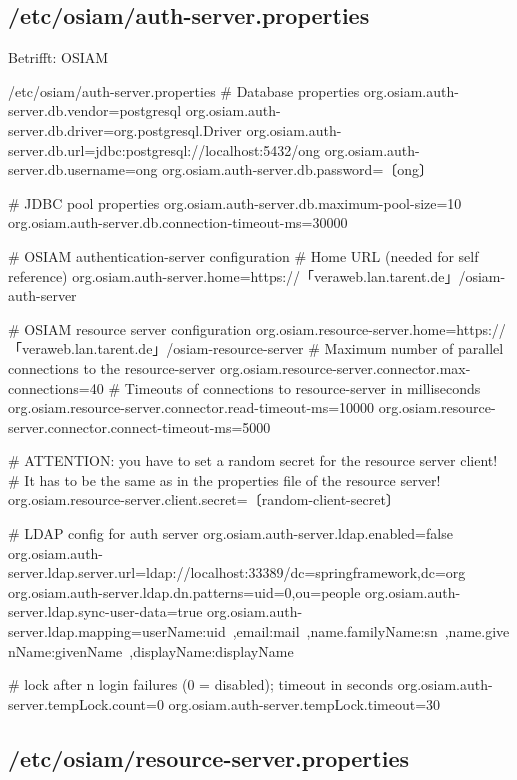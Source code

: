 \documentclass{tarentanleitung}
\begin{document}
\subsection{/etc/osiam/auth-server.properties}\label{subsec:refcfg-osiam-auth}

Betrifft: OSIAM

\begin{lstdump}{/etc/osiam/auth-server.properties}
# Database properties
org.osiam.auth-server.db.vendor=postgresql
org.osiam.auth-server.db.driver=org.postgresql.Driver
org.osiam.auth-server.db.url=jdbc:postgresql://localhost:5432/ong
org.osiam.auth-server.db.username=ong
org.osiam.auth-server.db.password=〔ong〕

# JDBC pool properties
org.osiam.auth-server.db.maximum-pool-size=10
org.osiam.auth-server.db.connection-timeout-ms=30000

# OSIAM authentication-server configuration
# Home URL (needed for self reference)
org.osiam.auth-server.home=https://「veraweb.lan.tarent.de」/osiam-auth-server

# OSIAM resource server configuration
org.osiam.resource-server.home=https://「veraweb.lan.tarent.de」/osiam-resource-server
# Maximum number of parallel connections to the resource-server
org.osiam.resource-server.connector.max-connections=40
# Timeouts of connections to resource-server in milliseconds
org.osiam.resource-server.connector.read-timeout-ms=10000
org.osiam.resource-server.connector.connect-timeout-ms=5000

# ATTENTION: you have to set a random secret for the resource server client!
# It has to be the same as in the properties file of the resource server!
org.osiam.resource-server.client.secret=〔random-client-secret〕

# LDAP config for auth server
org.osiam.auth-server.ldap.enabled=false
org.osiam.auth-server.ldap.server.url=ldap://localhost:33389/dc=springframework,dc=org
org.osiam.auth-server.ldap.dn.patterns=uid={0},ou=people
org.osiam.auth-server.ldap.sync-user-data=true
org.osiam.auth-server.ldap.mapping=userName:uid\
,email:mail\
,name.familyName:sn\
,name.givenName:givenName\
,displayName:displayName\

# lock after n login failures (0 = disabled); timeout in seconds
org.osiam.auth-server.tempLock.count=0
org.osiam.auth-server.tempLock.timeout=30
\end{lstdump}

\subsection{/etc/osiam/resource-server.properties}\label{subsec:refcfg-osiam-rsrc}
\end{document}
